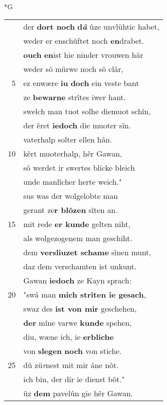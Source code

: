 \documentclass[8pt,a4paper,notitlepage]{article}
\begin{document}
\begin{table}[ht]
\begin{minipage}[t]{0.5\linewidth}
\small
\begin{center}*G
\end{center}
\begin{tabular}{rl}
 & der \textbf{dort noch} \textbf{d\textit{â}} ûze unvlühtic habet,\\ 
 & weder er enschûftet noch \textbf{en}drabet.\\ 
 & \textbf{ouch} \textbf{en}ist hie ninder vrouwen hâr\\ 
 & weder sô mürwe noch sô clâr,\\ 
5 & ez enwære \textbf{iu} \textbf{doch} ein veste bant\\ 
 & ze \textbf{bewarne} strîtes iwer hant.\\ 
 & swelch man tuot solhe diemuot schîn,\\ 
 & der êret \textbf{iedoch} die muoter sîn.\\ 
 & vaterhalp solter ellen hân.\\ 
10 & kêrt muoterhalp, hêr Gawan,\\ 
 & sô werdet ir swertes blicke bleich\\ 
 & unde manlîcher herte weich."\\ 
 & sus was der wolgelobte man\\ 
 & gerant ze\textbf{r blôzen} sîten an.\\ 
15 & mit rede \textbf{er kunde} gelten niht,\\ 
 & als wolgezogenem man geschiht.\\ 
 & dem \textbf{versliuzet schame} sînen munt,\\ 
 & daz dem verschamten ist unkunt.\\ 
 & Gawan \textbf{iedoch} ze Kayn sprach:\\ 
20 & "swâ man \textbf{mich strîten ie gesach},\\ 
 & swaz des \textbf{ist von mir} geschehen,\\ 
 & \textbf{der} mîne varwe \textbf{kunde} spehen,\\ 
 & diu, wæne ich, ie \textbf{erbliche}\\ 
 & von \textbf{slegen} \textbf{noch} von stiche.\\ 
25 & dû zü\textit{r}nest mit mir âne nôt.\\ 
 & ich bin, der dir ie dienst bôt."\\ 
 & ûz \textbf{dem} pavelûn gie hêr Gawan.\\ 

\end{tabular}
\end{minipage}
\end{table}
\end{document}
